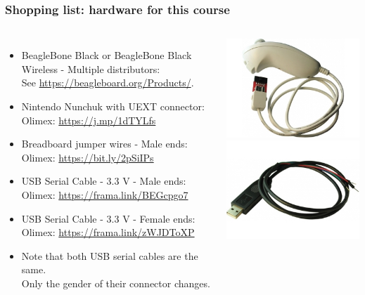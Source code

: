 \begin{frame}
\frametitle{Shopping list: hardware for this course}
  \begin{columns}
    \footnotesize
    \begin{itemize}
      \item BeagleBone Black or BeagleBone Black Wireless - Multiple distributors: \\
	    See \url{https://beagleboard.org/Products/}.
      \item Nintendo Nunchuk with UEXT connector: \\
            Olimex: \url{https://j.mp/1dTYLfs}
      \item Breadboard jumper wires - Male ends: \\
	    Olimex: \url{https://bit.ly/2pSiIPs}
      \item USB Serial Cable - 3.3 V - Male ends: \\
	    Olimex: \url{https://frama.link/BEGcpgo7}
      \item USB Serial Cable - 3.3 V - Female ends: \\
	    Olimex: \url{https://frama.link/zWJDToXP}
      \item Note that both USB serial cables are the same.\\
            Only the gender of their connector changes.
    \end{itemize}
    \includegraphics[height=0.25\textheight]{slides/kernel-shopping-list/nunchuk.jpg} \\
    \includegraphics[height=0.20\textheight]{slides/kernel-shopping-list/usb-serial-cable-male.jpg} \\

\end{columns}
\end{frame}
